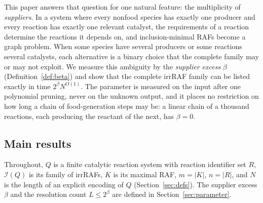 \documentclass[11pt,a4paper]{article}
\theoremstyle{plain}
\theoremstyle{definition}
\theoremstyle{remark}
\newcommand{\Irr}{\mathcal I}
\begin{document}
This paper answers that question for one natural feature: the multiplicity of \emph{suppliers}. In a system where every nonfood species has exactly one producer and every reaction has exactly one relevant catalyst, the requirements of a reaction determine the reactions it depends on, and inclusion-minimal RAFs become a graph problem. When some species have several producers or some reactions several catalysts, each alternative is a binary choice that the complete family may or may not exploit. We measure this ambiguity by the \emph{supplier excess} $\beta$ (Definition~\ref{def:beta}) and show that the complete irrRAF family can be listed exactly in time $2^\beta N^{O(1)}$. The parameter is measured on the input after one polynomial pruning, never on the unknown output, and it places no restriction on how long a chain of food-generation steps may be: a linear chain of a thousand reactions, each producing the reactant of the next, has $\beta=0$.

\subsection{Main results}

Throughout, $Q$ is a finite catalytic reaction system with reaction identifier set $R$, $\Irr(Q)$ is its family of irrRAFs, $K$ is its maximal RAF, $m=|K|$, $n=|R|$, and $N$ is the length of an explicit encoding of $Q$ (Section~\ref{sec:defs}). The supplier excess $\beta$ and the resolution count $L\le2^\beta$ are defined in Section~\ref{sec:parameter}.
\end{document}
